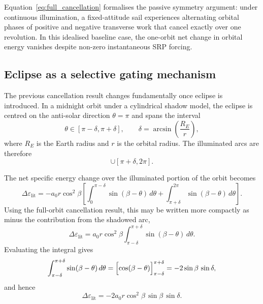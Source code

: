 \vspace{0.5em}
\par\noindent Equation~\eqref{eq:full_cancellation} formalises the passive symmetry argument: under continuous illumination, a fixed-attitude sail experiences alternating orbital phases of positive and negative transverse work that cancel exactly over one revolution. In this idealised baseline case, the one-orbit net change in orbital energy vanishes despite non-zero instantaneous SRP forcing.

\vspace{0.5em}
\subsection{\textbf{Eclipse as a selective gating mechanism}}

\noindent The previous cancellation result changes fundamentally once eclipse is introduced. In a midnight orbit under a cylindrical shadow model, the eclipse is centred on the anti-solar direction $\theta=\pi$ and spans the interval
\begin{equation}
\theta \in [\pi-\delta,\pi+\delta],
\qquad
\delta = \arcsin\left(\frac{R_E}{r}\right),
\label{eq:eclipse_bounds}
\end{equation}
where $R_E$ is the Earth radius and $r$ is the orbital radius. The illuminated arcs are therefore
\begin{equation}
[0,\pi-\delta]\cup[\pi+\delta,2\pi].
\end{equation}

\vspace{0.5em}
\par\noindent The net specific energy change over the illuminated portion of the orbit becomes
\begin{equation}
\Delta\varepsilon_{\text{lit}}
= -a_0 r \cos^2\beta
\left[
\int_0^{\pi-\delta}\sin(\beta-\theta)\,d\theta
+
\int_{\pi+\delta}^{2\pi}\sin(\beta-\theta)\,d\theta
\right].
\label{eq:lit_integral}
\end{equation}
Using the full-orbit cancellation result, this may be written more compactly as minus the contribution from the shadowed arc,
\begin{equation}
\Delta\varepsilon_{\text{lit}}
=
a_0 r \cos^2\beta
\int_{\pi-\delta}^{\pi+\delta}\sin(\beta-\theta)\,d\theta.
\end{equation}
Evaluating the integral gives
\begin{equation}
\int_{\pi-\delta}^{\pi+\delta}\sin(\beta-\theta)\,d\theta
= \Bigl[\cos(\beta-\theta)\Bigr]_{\pi-\delta}^{\pi+\delta}
= -2\sin\beta\,\sin\delta,
\end{equation}
and hence
\begin{equation}
\Delta\varepsilon_{\text{lit}}
=
-2a_0 r \cos^2\beta\,\sin\beta\,\sin\delta.
\label{eq:delta_e_final}
\end{equation}


